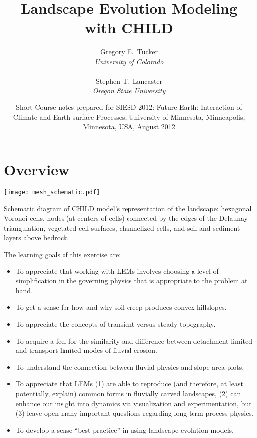 \documentclass[12pt,reqno]{amsart}
\title{Landscape Evolution Modeling with CHILD}
\author[G.E.\ Tucker \& S.T.\ Lancaster]{Gregory E.\ Tucker\\ {\em University of Colorado}\\ \\Stephen T.\ Lancaster\\ {\em Oregon State University}}
\date{Short Course notes prepared for SIESD 2012: Future Earth: Interaction of Climate and Earth-surface Processes, University of Minnesota, Minneapolis, Minnesota, USA, August 2012} %
\begin{document}
\maketitle

\setcounter{tocdepth}{1}
\tableofcontents


\section{Overview}

\begin{floatingfigure}{0.5\textwidth}
\centering
\texttt{[image: mesh\_schematic.pdf]}
\captionsetup{width=0.45\textwidth}
\caption{Schematic diagram of CHILD model's representation of the landscape: hexagonal Voronoi cells, nodes (at centers of cells) connected by the edges of the Delaunay triangulation, vegetated cell surfaces, channelized cells, and soil and sediment layers above bedrock.}
\label{fig:schem}
\end{floatingfigure}

The learning goals of this exercise are:
\begin{itemize}
\item{To appreciate that working with LEMs involves choosing a level of simplification in the governing physics that is appropriate to the problem at hand.}
\item{To get a sense for how and why soil creep produces convex hillslopes.}
\item{To appreciate the concepts of transient versus steady topography.}
\item{To acquire a feel for the similarity and difference between detachment-limited and transport-limited modes of fluvial erosion.}
\item{To understand the connection between fluvial physics and slope-area plots.}
\item{To appreciate that LEMs (1) are able to reproduce (and therefore, at least potentially, explain) common forms in fluvially carved landscapes, (2) can enhance our insight into dynamics via visualization and experimentation, but (3) leave open many important questions regarding long-term process physics.}
\item{To develop a sense ``best practice'' in using landscape evolution models.}
\end{itemize}
\end{document}
